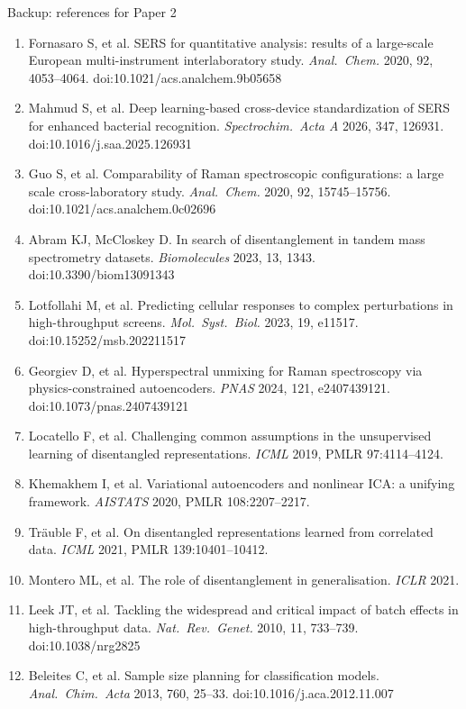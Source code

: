 \documentclass[aspectratio=169,10pt]{beamer}
\begin{document}
\begin{frame}{Backup: references for Paper 2}
\tiny
\begin{enumerate}\setlength{\itemsep}{0pt}
  \item Fornasaro S, et al. SERS for quantitative analysis: results of a large-scale European multi-instrument interlaboratory study. \emph{Anal.\ Chem.} 2020, 92, 4053--4064. doi:10.1021/acs.analchem.9b05658
  \item Mahmud S, et al. Deep learning-based cross-device standardization of SERS for enhanced bacterial recognition. \emph{Spectrochim.\ Acta A} 2026, 347, 126931. doi:10.1016/j.saa.2025.126931
  \item Guo S, et al. Comparability of Raman spectroscopic configurations: a large scale cross-laboratory study. \emph{Anal.\ Chem.} 2020, 92, 15745--15756. doi:10.1021/acs.analchem.0c02696
  \item Abram KJ, McCloskey D. In search of disentanglement in tandem mass spectrometry datasets. \emph{Biomolecules} 2023, 13, 1343. doi:10.3390/biom13091343
  \item Lotfollahi M, et al. Predicting cellular responses to complex perturbations in high-throughput screens. \emph{Mol.\ Syst.\ Biol.} 2023, 19, e11517. doi:10.15252/msb.202211517
  \item Georgiev D, et al. Hyperspectral unmixing for Raman spectroscopy via physics-constrained autoencoders. \emph{PNAS} 2024, 121, e2407439121. doi:10.1073/pnas.2407439121
  \item Locatello F, et al. Challenging common assumptions in the unsupervised learning of disentangled representations. \emph{ICML} 2019, PMLR 97:4114--4124.
  \item Khemakhem I, et al. Variational autoencoders and nonlinear ICA: a unifying framework. \emph{AISTATS} 2020, PMLR 108:2207--2217.
  \item Tr\"auble F, et al. On disentangled representations learned from correlated data. \emph{ICML} 2021, PMLR 139:10401--10412.
  \item Montero ML, et al. The role of disentanglement in generalisation. \emph{ICLR} 2021.
  \item Leek JT, et al. Tackling the widespread and critical impact of batch effects in high-throughput data. \emph{Nat.\ Rev.\ Genet.} 2010, 11, 733--739. doi:10.1038/nrg2825
  \item Beleites C, et al. Sample size planning for classification models. \emph{Anal.\ Chim.\ Acta} 2013, 760, 25--33. doi:10.1016/j.aca.2012.11.007

\end{enumerate}
\end{frame}
\end{document}
